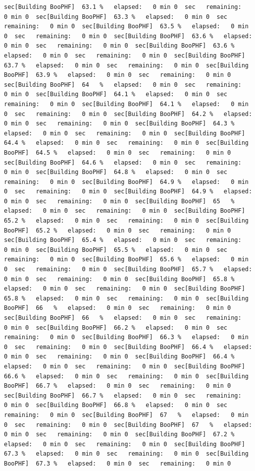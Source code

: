 \documentclass[
]{book}
\begin{document}
\begin{verbatim}
sec[Building BooPHF]  63.1 %   elapsed:   0 min 0  sec   remaining:   0 min 0  sec[Building BooPHF]  63.3 %   elapsed:   0 min 0  sec   remaining:   0 min 0  sec[Building BooPHF]  63.5 %   elapsed:   0 min 0  sec   remaining:   0 min 0  sec[Building BooPHF]  63.6 %   elapsed:   0 min 0  sec   remaining:   0 min 0  sec[Building BooPHF]  63.6 %   elapsed:   0 min 0  sec   remaining:   0 min 0  sec[Building BooPHF]  63.7 %   elapsed:   0 min 0  sec   remaining:   0 min 0  sec[Building BooPHF]  63.9 %   elapsed:   0 min 0  sec   remaining:   0 min 0  sec[Building BooPHF]  64   %   elapsed:   0 min 0  sec   remaining:   0 min 0  sec[Building BooPHF]  64.1 %   elapsed:   0 min 0  sec   remaining:   0 min 0  sec[Building BooPHF]  64.1 %   elapsed:   0 min 0  sec   remaining:   0 min 0  sec[Building BooPHF]  64.2 %   elapsed:   0 min 0  sec   remaining:   0 min 0  sec[Building BooPHF]  64.3 %   elapsed:   0 min 0  sec   remaining:   0 min 0  sec[Building BooPHF]  64.4 %   elapsed:   0 min 0  sec   remaining:   0 min 0  sec[Building BooPHF]  64.5 %   elapsed:   0 min 0  sec   remaining:   0 min 0  sec[Building BooPHF]  64.6 %   elapsed:   0 min 0  sec   remaining:   0 min 0  sec[Building BooPHF]  64.8 %   elapsed:   0 min 0  sec   remaining:   0 min 0  sec[Building BooPHF]  64.9 %   elapsed:   0 min 0  sec   remaining:   0 min 0  sec[Building BooPHF]  64.9 %   elapsed:   0 min 0  sec   remaining:   0 min 0  sec[Building BooPHF]  65   %   elapsed:   0 min 0  sec   remaining:   0 min 0  sec[Building BooPHF]  65.2 %   elapsed:   0 min 0  sec   remaining:   0 min 0  sec[Building BooPHF]  65.2 %   elapsed:   0 min 0  sec   remaining:   0 min 0  sec[Building BooPHF]  65.4 %   elapsed:   0 min 0  sec   remaining:   0 min 0  sec[Building BooPHF]  65.5 %   elapsed:   0 min 0  sec   remaining:   0 min 0  sec[Building BooPHF]  65.6 %   elapsed:   0 min 0  sec   remaining:   0 min 0  sec[Building BooPHF]  65.7 %   elapsed:   0 min 0  sec   remaining:   0 min 0  sec[Building BooPHF]  65.8 %   elapsed:   0 min 0  sec   remaining:   0 min 0  sec[Building BooPHF]  65.8 %   elapsed:   0 min 0  sec   remaining:   0 min 0  sec[Building BooPHF]  66   %   elapsed:   0 min 0  sec   remaining:   0 min 0  sec[Building BooPHF]  66   %   elapsed:   0 min 0  sec   remaining:   0 min 0  sec[Building BooPHF]  66.2 %   elapsed:   0 min 0  sec   remaining:   0 min 0  sec[Building BooPHF]  66.3 %   elapsed:   0 min 0  sec   remaining:   0 min 0  sec[Building BooPHF]  66.4 %   elapsed:   0 min 0  sec   remaining:   0 min 0  sec[Building BooPHF]  66.4 %   elapsed:   0 min 0  sec   remaining:   0 min 0  sec[Building BooPHF]  66.6 %   elapsed:   0 min 0  sec   remaining:   0 min 0  sec[Building BooPHF]  66.7 %   elapsed:   0 min 0  sec   remaining:   0 min 0  sec[Building BooPHF]  66.7 %   elapsed:   0 min 0  sec   remaining:   0 min 0  sec[Building BooPHF]  66.8 %   elapsed:   0 min 0  sec   remaining:   0 min 0  sec[Building BooPHF]  67   %   elapsed:   0 min 0  sec   remaining:   0 min 0  sec[Building BooPHF]  67   %   elapsed:   0 min 0  sec   remaining:   0 min 0  sec[Building BooPHF]  67.2 %   elapsed:   0 min 0  sec   remaining:   0 min 0  sec[Building BooPHF]  67.3 %   elapsed:   0 min 0  sec   remaining:   0 min 0  sec[Building BooPHF]  67.3 %   elapsed:   0 min 0  sec   remaining:   0 min 0  
\end{verbatim}
\end{document}
